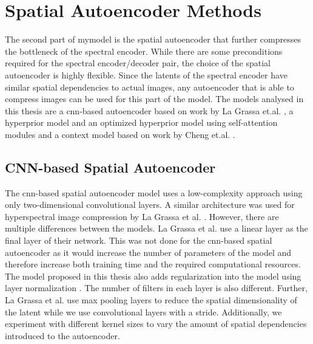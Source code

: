 \section{Spatial Autoencoder Methods\label{sec:spatialae}}
The second part of \ac{mymodel} is the spatial autoencoder that further compresses the bottleneck of the spectral encoder. While there are some preconditions required for the spectral encoder/decoder pair, the choice of the spatial autoencoder is highly flexible. Since the latents of the spectral encoder have similar spatial dependencies to actual images, any autoencoder that is able to compress images can be used for this part of the model. The models analysed in this thesis are a \ac{cnn}-based autoencoder based on work by La Grassa et.al. \citep{la_grassa_hyperspectral_2022}, a hyperprior model \citep{balle_variational_2018} and an optimized hyperprior model using self-attention modules and a context model based on work by Cheng et.al. \citep{cheng_learned_2020}.
\subsection{CNN-based Spatial Autoencoder\label{sec:conv2d}}
The \ac{cnn}-based spatial autoencoder model uses a low-complexity approach using only two-dimensional convolutional layers. A similar architecture was used for hyperspectral image compression by La Grassa et al. \citep{la_grassa_hyperspectral_2022}. However, there are multiple differences between the models. La Grassa et al. use a linear layer as the final layer of their network. This was not done for the \ac{cnn}-based spatial autoencoder as it would increase the number of parameters of the model and therefore increase both training time and the required computational resources. The model proposed in this thesis also adds regularization into the model using layer normalization \citep{ba_layer_2016}. The number of filters in each layer is also different. Further, La Grassa et al. use max pooling layers to reduce the spatial dimensionality of the latent while we use convolutional layers with a stride. Additionally, we experiment with different kernel sizes to vary the amount of spatial dependencies introduced to the autoencoder.

